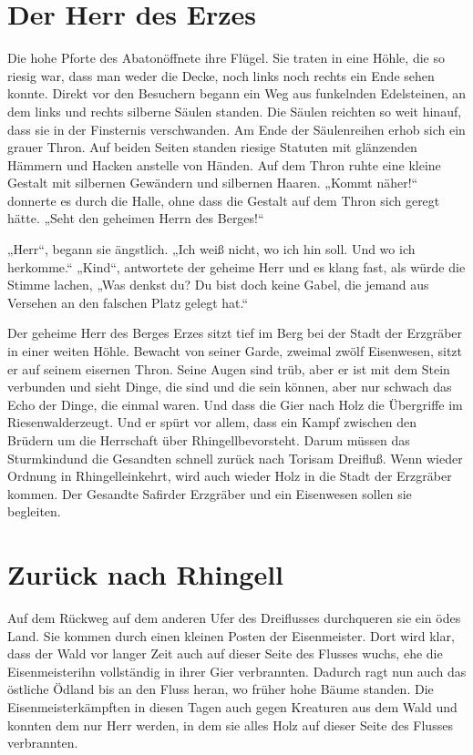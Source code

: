 \documentclass[12pt,a4paper,onecolumn,twoside,ngerman]{book}
\newcommand{\Sturmkind}{Sturmkind}
\newcommand{\Rhingell}{Rhingell}
\newcommand{\Dreifluss}{Dreifluß}
\newcommand{\Toris}{Toris}
\newcommand{\Riesenwald}{Riesenwald}
\newcommand{\Eisenmeister}{Eisenmeister}
\newcommand{\Abaton}{Abaton}
\newcommand{\Safir}{Safir}
\begin{document}
\section{Der Herr des Erzes}
Die hohe Pforte des \Abaton öffnete ihre Flügel. Sie traten in eine Höhle, die so riesig war, dass man weder die Decke, noch links noch rechts ein Ende sehen konnte. Direkt vor den Besuchern begann ein Weg aus funkelnden Edelsteinen, an dem links und rechts silberne Säulen standen. Die Säulen reichten so weit hinauf, dass sie in der Finsternis verschwanden.
Am Ende der Säulenreihen erhob sich ein grauer Thron. Auf beiden Seiten standen riesige Statuten mit glänzenden Hämmern und Hacken anstelle von Händen. Auf dem Thron ruhte eine kleine Gestalt mit silbernen Gewändern und silbernen Haaren. „Kommt näher!“ donnerte es durch die Halle, ohne dass die Gestalt auf dem Thron sich geregt hätte. „Seht den geheimen Herrn des Berges!“ 

„Herr“, begann sie ängstlich. „Ich weiß nicht, wo ich hin soll. Und wo ich herkomme.“
„Kind“, antwortete der geheime Herr und es klang fast, als würde die Stimme lachen, „Was denkst du? Du bist doch keine Gabel, die jemand aus Versehen an den falschen Platz gelegt hat.“

Der geheime Herr des Berges Erzes sitzt tief im Berg bei der Stadt der Erzgräber in einer weiten Höhle. Bewacht von seiner Garde, zweimal zwölf Eisenwesen, sitzt er auf seinem eisernen Thron. Seine Augen sind trüb, aber er ist mit dem Stein verbunden und sieht Dinge, die sind und die sein können, aber nur schwach das Echo der Dinge, die einmal waren. Und dass die Gier nach Holz die Übergriffe im \Riesenwald erzeugt. Und er spürt vor allem, dass ein Kampf zwischen den Brüdern um die Herrschaft über \Rhingell bevorsteht. Darum müssen das \Sturmkind und die Gesandten schnell zurück nach \Toris am \Dreifluss. Wenn wieder Ordnung in \Rhingell einkehrt, wird auch wieder Holz in die Stadt der Erzgräber kommen. Der Gesandte \Safir der Erzgräber und ein Eisenwesen sollen sie begleiten.

\section{Zurück nach \Rhingell}
Auf dem Rückweg auf dem anderen Ufer des Dreiflusses durchqueren sie ein ödes Land. Sie kommen durch einen kleinen Posten der \Eisenmeister. Dort wird klar, dass der Wald vor langer Zeit auch auf dieser Seite des Flusses wuchs, ehe die \Eisenmeister ihn vollständig in ihrer Gier verbrannten. Dadurch ragt nun auch das östliche Ödland bis an den Fluss heran, wo früher hohe Bäume standen. Die \Eisenmeister kämpften in diesen Tagen auch gegen Kreaturen aus dem Wald und konnten dem nur Herr werden, in dem sie alles Holz auf dieser Seite des Flusses verbrannten.
\end{document}
